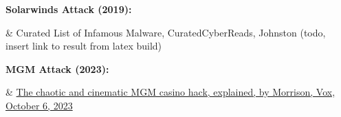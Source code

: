 \documentclass[a4paper]{article}
\begin{document}
	\noindent\textbf{Solarwinds Attack (2019):}
	\begin{easylist}[itemize]
	& Curated List of Infamous Malware, CuratedCyberReads, Johnston (todo, insert link to result from latex build)
	\end{easylist}

	\noindent\textbf{MGM Attack (2023):}
 	\begin{easylist}[itemize]
 	& \href{https://www.vox.com/technology/2023/9/15/23875113/mgm-hack-casino-vishing-cybersecurity-ransomware}{The chaotic and cinematic MGM casino hack, explained, by Morrison, Vox, October 6, 2023}
 	\end{easylist}
  
	\bigskip\noindent
\end{document}
